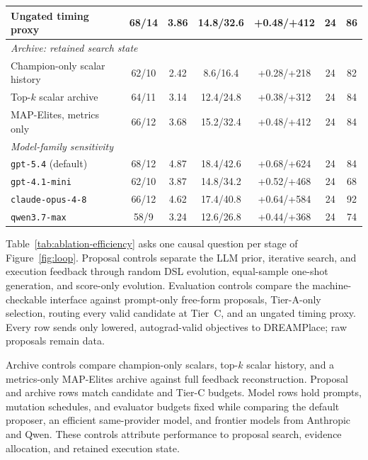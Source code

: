 \begin{table}[!htbp]
{\begin{tabular}{p{}cccccc}
Ungated timing proxy       & 68/14 & 3.86 & 14.8/32.6 & +0.48/+412 & 24 & 86 \\
\midrule
\multicolumn{7}{l}{\textit{Archive: retained search state}} \\
Champion-only scalar history & 62/10 & 2.42 & 8.6/16.4  & +0.28/+218 & 24 & 82 \\
Top-$k$ scalar archive       & 64/11 & 3.14 & 12.4/24.8 & +0.38/+312 & 24 & 84 \\
MAP-Elites, metrics only     & 66/12 & 3.68 & 15.2/32.4 & +0.48/+412 & 24 & 84 \\
\midrule
\multicolumn{7}{l}{\textit{Model-family sensitivity}} \\
\texttt{gpt-5.4} (default)    & 68/12 & 4.87 & 18.4/42.6 & +0.68/+624 & 24 & 84 \\
\texttt{gpt-4.1-mini}         & 62/10 & 3.87 & 14.8/34.2 & +0.52/+468 & 24 & 68 \\
\texttt{claude-opus-4-8}      & 66/12 & 4.62 & 17.4/40.8 & +0.64/+584 & 24 & 92 \\
\texttt{qwen3.7-max}          & 58/9  & 3.24 & 12.6/26.8 & +0.44/+368 & 24 & 74 \\
\bottomrule
\end{tabular}
}
\end{table}

Table~\ref{tab:ablation-efficiency} asks one causal question per stage of
Figure~\ref{fig:loop}. Proposal controls separate the LLM prior, iterative search,
and execution feedback through random DSL evolution, equal-sample one-shot
generation, and score-only evolution. Evaluation controls compare the
machine-checkable interface against prompt-only free-form proposals, Tier-A-only
selection, routing every valid candidate at Tier~C, and an ungated timing proxy.
Every row sends only lowered, autograd-valid objectives to DREAMPlace; raw
proposals remain data.

Archive controls compare champion-only scalars, top-$k$ scalar history, and a
metrics-only MAP-Elites archive against full feedback reconstruction. Proposal
and archive rows match candidate and Tier-C budgets. Model rows hold prompts,
mutation schedules, and evaluator
budgets fixed while comparing the default proposer, an efficient same-provider
model, and frontier models from Anthropic and Qwen. These controls attribute
performance to proposal search, evidence allocation, and retained execution
state.
